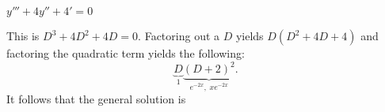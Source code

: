 $y''' + 4y'' + 4' = 0$

\soln This is $D^3 + 4D^2 + 4D = 0$. Factoring out a $D$ yields $D(D^2+4D+4)$ and factoring the quadratic term yields the following:
$$\underbrace{D}_{1}\underbrace{(D+2)^2}_{e^{-2x}, \; xe^{-2x}}.$$
It follows that the general solution is 
